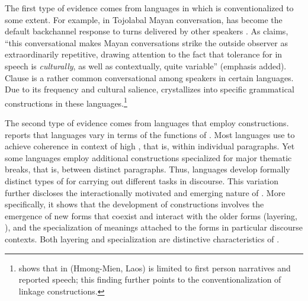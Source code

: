 \documentclass[output=paper]{LSP/langsci}
\begin{document}
The first type of evidence comes from languages in which  is conventionalized to some extent. For example, in Tojolabal Mayan conversation,  has become the default backchannel response to turns delivered by other speakers \citep[][260--261]{brody.1986}. As \citet[][224]{brown.2000} claims, ``this conversational  makes Mayan conversations strike the outside observer as extraordinarily repetitive, drawing attention to the fact that tolerance for  in speech is \textit{culturally}, as well as contextually, quite variable'' (emphasis added). Clause  is a rather common conversational  among speakers in certain languages. Due to its frequency \citep{bybee03} and cultural salience,  crystallizes into specific grammatical constructions in these languages.\footnote{ shows that  in  (Hmong-Mien, Laos) is limited to first person narratives and reported speech; this finding further points to the conventionalization of linkage constructions.} 

The second type of evidence comes from languages that employ  constructions. \citet[][112--113]{Guillaume2011} reports that languages vary in terms of the functions of . Most languages use  to achieve coherence in context of high , that is, within individual paragraphs. Yet some languages employ additional  constructions specialized for major thematic breaks, that is, between distinct paragraphs. Thus, languages develop formally distinct types of  for carrying out different tasks in discourse. This variation further discloses the interactionally motivated and emerging nature of . More specifically, it shows that the development of  constructions involves the emergence of new forms that coexist and interact with the older forms (layering, \citealt{hopper91}), and the specialization of meanings attached to the forms in particular discourse contexts. Both layering and specialization are distinctive characteristics of  \citep{hopper93}. 
\end{document}
